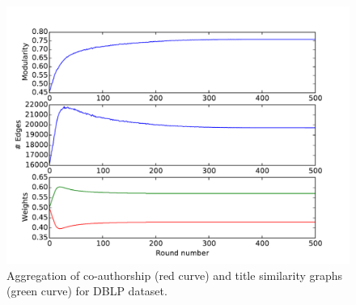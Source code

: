 \documentclass[twoside,twocolumn]{article}
\begin{document}
\begin{figure}[t]
\begin{centering}
\includegraphics[width=\columnwidth]{DBLPchart.pdf}
\par\end{centering}
\caption{Aggregation of co-authorship (red curve) and title similarity graphs
(green curve) for DBLP dataset.} 
\label{fig:dblp}
\end{figure}
\end{document}
